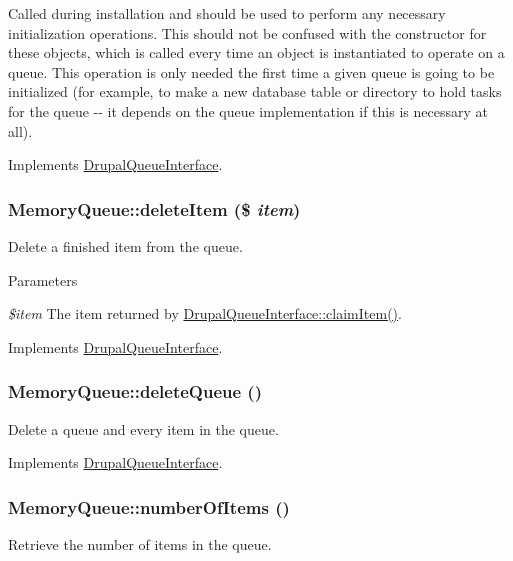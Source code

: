 Called during installation and should be used to perform any necessary initialization operations. This should not be confused with the constructor for these objects, which is called every time an object is instantiated to operate on a queue. This operation is only needed the first time a given queue is going to be initialized (for example, to make a new database table or directory to hold tasks for the queue -\/-\/ it depends on the queue implementation if this is necessary at all). 

Implements \hyperlink{interfaceDrupalQueueInterface_a5a657d8c1d5bb429b3e594fa0c883ad3}{DrupalQueueInterface}.\hypertarget{classMemoryQueue_a3091327204bb8b2e9c13baf32142f7f5}{
\subsubsection[{deleteItem}]{\setlength{\rightskip}{0pt plus 5cm}MemoryQueue::deleteItem (\$ {\em item})}}
\label{classMemoryQueue_a3091327204bb8b2e9c13baf32142f7f5}
Delete a finished item from the queue.


\begin{DoxyParams}{Parameters}
\item[{\em \$item}]The item returned by \hyperlink{interfaceDrupalQueueInterface_a2f0f2ccc1f4d55c0890897ea85e75954}{DrupalQueueInterface::claimItem()}. \end{DoxyParams}


Implements \hyperlink{interfaceDrupalQueueInterface_aa61212089c1bcc410e8f87f8e619e351}{DrupalQueueInterface}.\hypertarget{classMemoryQueue_a055cd4bf4b319accf5ffa2c6f22685f1}{
\subsubsection[{deleteQueue}]{\setlength{\rightskip}{0pt plus 5cm}MemoryQueue::deleteQueue ()}}
\label{classMemoryQueue_a055cd4bf4b319accf5ffa2c6f22685f1}
Delete a queue and every item in the queue. 

Implements \hyperlink{interfaceDrupalQueueInterface_ad403fed96dbd86e64a8a48c33fe5f2bc}{DrupalQueueInterface}.\hypertarget{classMemoryQueue_a266edfebcf6567707f3e2dafc3200491}{
\subsubsection[{numberOfItems}]{\setlength{\rightskip}{0pt plus 5cm}MemoryQueue::numberOfItems ()}}
\label{classMemoryQueue_a266edfebcf6567707f3e2dafc3200491}
Retrieve the number of items in the queue.

